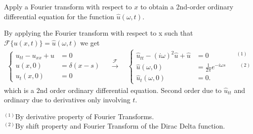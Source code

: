 \documentclass[12pt]{article}
\newcommand{\F}{\mathcal{F}}
\newenvironment{subproblem}[2][Part]{\begin{trivlist}
  \item[\hskip \labelsep {\bfseries #1}\hskip \labelsep {\bfseries (#2)}]}{\end{trivlist}}
\newenvironment{solution}[1][Solution]{\begin{trivlist}
  \item[\hskip \labelsep {\bfseries #1} \hskip \labelsep]}{\end{trivlist}}
\theoremstyle{remark}
\begin{document}
\begin{subproblem}{a}
  Apply a Fourier transform with respect to \(x\) to obtain a 2nd-order ordinary differential
  equation for the function \(\hat{u}(\omega,t)\).
\end{subproblem}
\begin{solution}
  $ $\\
  By applying the Fourier transform with respect to x such that \(\F\{u(x,t)\} =
  \hat{u}(\omega,t)\) we get
  \begin{align*}
    \left\{
    \begin{array}{ll}
      u_{tt}-u_{xx} + u &= 0 \\
      u(x,0) &= \delta(x-s) \\
      u_t(x,0) &= 0
    \end{array}
                 \right.
                 \quad\xrightarrow{\F}\quad
                 \left\{
                 \begin{array}{ll}
                   \hat{u}_{tt} - (i\omega)^2\hat{u} + \hat{u} &= 0 \qquad\qquad^{(1)}\\
                   \hat{u}(\omega,0) &= \frac{1}{2\pi}e^{-i\omega s} \qquad^{(2)}\\
                   \hat{u}_t(\omega,0) &= 0.
                 \end{array}
                                         \right.
  \end{align*}
  which is a 2nd order ordinary differential equation. Second order due to \(\hat{u}_{tt}\) 
  and ordinary due to derivatives only involving \(t\). \\
  $ $ \\
  \begin{footnotesize}
    \(^{(1)}\)By derivative property of Fourier Transforms. \\
    \(^{(2)}\)By shift property and Fourier Transform of the Dirac Delta function.
  \end{footnotesize}
\end{solution}
\end{document}
